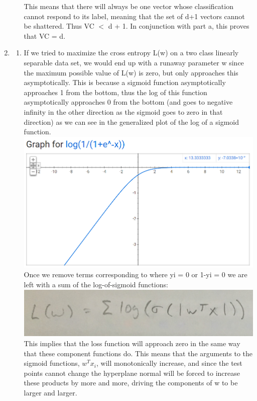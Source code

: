 \documentclass{article}
\begin{document}
\begin{enumerate}
\begin{enumerate}
This means that there will always be one vector whose classification cannot respond to its label, meaning that the set of d+1 vectors cannot be shattered. Thus VC $<$ d + 1. In conjunction with part a, this proves that VC = d. 
\end{enumerate}
\item
\begin{enumerate}
\item If we tried to maximize the cross entropy L(w) on a two class linearly separable data set, we would end up with a runaway parameter w since the maximum possible value of L(w) is zero, but only approaches this asymptotically. This is because a sigmoid function asymptotically approaches 1 from the bottom, thus the log of this function asymptotically approaches 0 from the bottom (and goes to negative infinity in the other direction as the sigmoid goes to zero in that direction) as we can see in the generalized plot of the log of a sigmoid function. \\
\includegraphics[scale=.9]{sigmoid_graph.PNG}
\\
Once we remove terms corresponding to where yi = 0 or 1-yi = 0 we are left with a sum of the log-of-sigmoid functions: \\
\includegraphics[scale=.1]{IMG_3686.JPG}\\
This implies that the loss function will approach zero in the same way that these component functions do. This means that the arguments to the sigmoid functions, $w^Tx_i$,  will monotonically increase, and since the test points cannot change the hyperplane normal will be forced to increase these products by more and more, driving the components of w to be larger and larger. 

\end{enumerate}
\end{enumerate}
\end{document}
